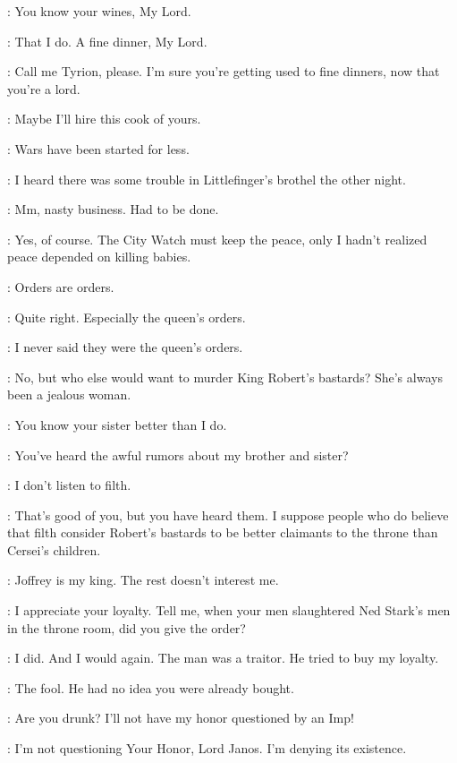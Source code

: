 \TYRION: You know your wines, My Lord.

\JANOSSLYNT: That I do. A fine dinner, My Lord.

\TYRION: Call me Tyrion, please. I'm sure you're getting used to fine dinners, now that you're a lord.

\JANOSSLYNT: Maybe I'll hire this cook of yours.

\TYRION: Wars have been started for less.


\TYRION: I heard there was some trouble in Littlefinger's brothel the other night.

\JANOSSLYNT: Mm, nasty business. Had to be done.

\TYRION: Yes, of course. The City Watch must keep the peace, only I hadn't realized peace depended on killing babies.

\JANOSSLYNT: Orders are orders.

\TYRION: Quite right. Especially the queen's orders.

\JANOSSLYNT: I never said they were the queen's orders.

\TYRION: No, but who else would want to murder King Robert's bastards? She's always been a jealous woman.

\JANOSSLYNT: You know your sister better than I do.

\TYRION: You've heard the awful rumors about my brother and sister?

\JANOSSLYNT: I don't listen to filth.

\TYRION: That's good of you, but you have heard them. I suppose people who do believe that filth consider Robert's bastards to be better claimants to the throne than Cersei's children.

\JANOSSLYNT: Joffrey is my king. The rest doesn't interest me.

\TYRION: I appreciate your loyalty. Tell me, when your men slaughtered Ned Stark's men in the throne room, did you give the order?

\JANOSSLYNT: I did. And I would again. The man was a traitor. He tried to buy my loyalty.

\TYRION: The fool. He had no idea you were already bought.

\JANOSSLYNT: Are you drunk? I'll not have my honor questioned by an Imp!

\TYRION: I'm not questioning Your Honor, Lord Janos. I'm denying its existence.

